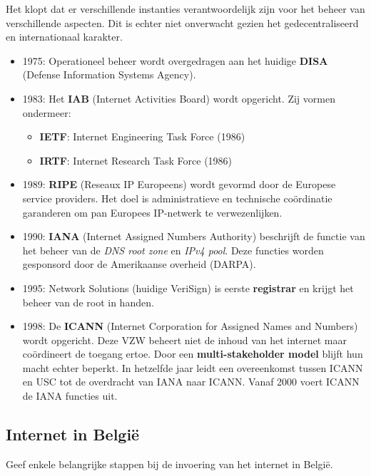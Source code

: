 \documentclass[../main.tex]{subfiles}
\begin{document}
\begin{solution}
Het klopt dat er verschillende instanties verantwoordelijk zijn voor het beheer van verschillende aspecten. Dit is echter niet onverwacht gezien het gedecentraliseerd en internationaal karakter.
\begin{itemize}
	\item 1975: Operationeel beheer wordt overgedragen aan het huidige \textbf{DISA} (Defense Information Systems Agency).
	\item 1983: Het \textbf{IAB} (Internet Activities Board) wordt opgericht. Zij vormen ondermeer:
	\begin{itemize}
		\item \textbf{IETF}: Internet Engineering Task Force (1986)
		\item \textbf{IRTF}: Internet Research Task Force (1986)
	\end{itemize}
	\item 1989: \textbf{RIPE} (Reseaux IP Europeens) wordt gevormd door de Europese service providers. Het doel is administratieve en technische coördinatie garanderen om pan Europees IP-netwerk te verwezenlijken.
	\item 1990: \textbf{IANA} (Internet Assigned Numbers Authority) beschrijft de functie van het beheer van de \emph{DNS root zone} en \emph{IPv4 pool}. Deze functies worden gesponsord door de Amerikaanse overheid (DARPA).
	\item 1995: Network Solutions (huidige VeriSign) is eerste \textbf{registrar} en krijgt het beheer van de root in handen.
	\item 1998: De \textbf{ICANN} (Internet Corporation for Assigned Names and Numbers) wordt opgericht. Deze VZW beheert niet de inhoud van het internet maar co\"ordineert de toegang ertoe. Door een \textbf{multi-stakeholder model} blijft hun macht echter beperkt. In hetzelfde jaar leidt een overeenkomst tussen ICANN en USC tot de overdracht van IANA naar ICANN. Vanaf 2000 voert ICANN de IANA functies uit.
\end{itemize}
\end{solution}



\subsection{Internet in Belgi\"e}
\begin{question}
Geef enkele belangrijke stappen bij de invoering van het internet in Belgi\"e.
\end{question}
\end{document}
